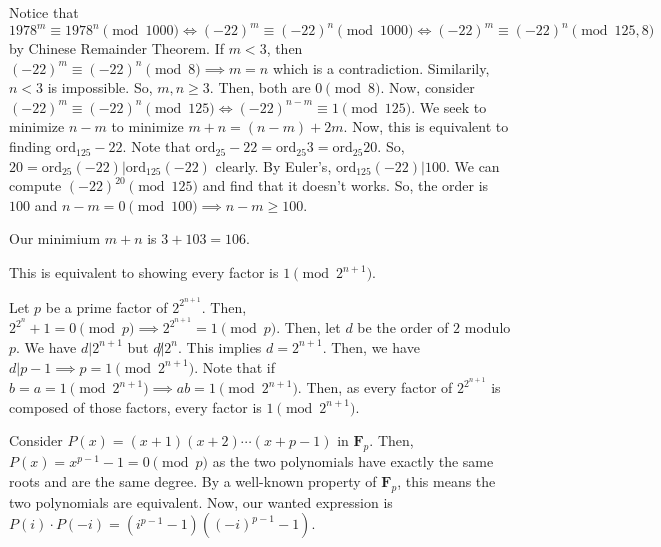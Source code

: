\documentclass[11pt]{article}
\begin{document}
\begin{sol}
Notice that $1978^{m}\equiv 1978^{n}\pmod{1000}\iff (-22)^m \equiv (-22)^n \pmod{1000} \iff (-22)^m \equiv (-22)^n \pmod{125,8}$ by Chinese Remainder Theorem.
If $m<3$, then $(-22)^m\equiv (-22)^n\pmod{8}\implies m=n$ which is a contradiction. Similarily, $n<3$ is impossible. So, $m,n\ge3$. Then, both are $0\pmod{8}$.
Now, consider $(-22)^{m}\equiv (-22)^{n}\pmod{125}\iff (-22)^{n-m}\equiv 1\pmod{125}$. We seek to minimize $n-m$ to minimize $m+n=(n-m)+2m$. Now, this is equivalent to finding $\text{ord}_{125} -22$. Note that $\text{ord}_{25} -22 = \text{ord}_{25} 3 = \text{ord}_{25} 20$. So, $20=\text{ord}_{25}(-22) |\text{ord}_{125} (-22)$ clearly. By Euler's, $\text{ord}_{125} (-22)|100$. We can compute $(-22)^{20} \pmod{125}$ and find that it doesn't works. So, the order is $100$ and $n-m=0\pmod{100}\implies n-m\ge 100$.

Our minimium $m+n$ is $3+103=\boxed{106}$.
\end{sol}


\begin{sol}
This is equivalent to showing every factor is $1\pmod{2^{n+1}}$.

Let $p$ be a prime factor of $2^{2^{n+1}}$. Then, $2^{2^{n}}+1=0\pmod{p}\implies 2^{2^{n+1}}=1\pmod{p}$. Then, let $d$ be the order of $2$ modulo $p$. We have $d|2^{n+1}$ but $d\not | 2^{n}$. This implies $d=2^{n+1}$. Then, we have $d|p-1\implies p=1\pmod{2^{n+1}}$. Note that if $b=a=1\pmod{2^{n+1}}\implies ab = 1\pmod{2^{n+1}}$. Then, as every factor of $2^{2^{n+1}}$ is composed of those factors, every factor is $1\pmod{2^{n+1}}$.
\end{sol}


\begin{sol}
Consider $P(x)=(x+1)(x+2)\cdots (x+p-1)$ in $\mathbf{F}_{p}$. Then, $P(x)=x^{p-1}-1=0\pmod{p}$ as the two polynomials have exactly the same roots and are the same degree. By a well-known property of $\mathbf{F}_{p}$, this means the two polynomials are equivalent. Now, our wanted expression is $P(i)\cdot P(-i)=\boxed{(i^{p-1}-1)((-i)^{p-1}-1)}$.
\end{sol}

\end{document}

